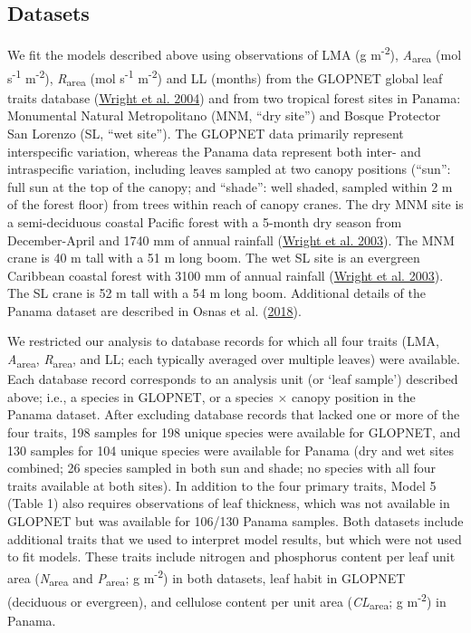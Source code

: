 \documentclass[
  12pt,
  a4paper,
,tablecaptionabove
]{scrartcl}
\providecommand{\DIFaddend}{} %
\DeclareRobustCommand{\DIFaddend}{\DIFOaddend \let\includegraphics\DIFOincludegraphics} %
\begin{document}
\DIFaddend \hypertarget{datasets}{%
\subsection{Datasets}\label{datasets}}

We fit the models described above using observations of LMA (g m\textsuperscript{-2}), \emph{A}\textsubscript{area} (mol s\textsuperscript{-1} m\textsuperscript{-2}), \emph{R}\textsubscript{area} (mol s\textsuperscript{-1} m\textsuperscript{-2}) and LL (months) from the GLOPNET global leaf traits database (\protect\hyperlink{ref-Wright2004a}{Wright et al. 2004}) and from two tropical forest sites in Panama: Monumental Natural Metropolitano (MNM, ``dry site'') and Bosque Protector San Lorenzo (SL, ``wet site'').
The GLOPNET data primarily represent interspecific variation, whereas the Panama data represent both inter- and intraspecific variation, including leaves sampled at two canopy positions (``sun'': full sun at the top of the canopy; and ``shade'': well shaded, sampled within 2 m of the forest floor) from trees within reach of canopy cranes.
The dry MNM site is a semi-deciduous coastal Pacific forest with a 5-month dry season from December-April and 1740 mm of annual rainfall (\protect\hyperlink{ref-Wright2003}{Wright et al. 2003}).
The MNM crane is 40 m tall with a 51 m long boom. The wet SL site is an evergreen Caribbean coastal forest with 3100 mm of annual rainfall (\protect\hyperlink{ref-Wright2003}{Wright et al. 2003}).
The SL crane is 52 m tall with a 54 m long boom.
Additional details of the Panama dataset are described in Osnas et al. (\protect\hyperlink{ref-Osnas2018}{2018}).

We restricted our analysis to database records for which all four traits (LMA, \emph{A}\textsubscript{area}, \emph{R}\textsubscript{area}, and LL; each typically averaged over multiple leaves) were available.
Each database record corresponds to an analysis unit (or `leaf sample') described above; i.e., a species in GLOPNET, or a species \(\times\) canopy position in the Panama dataset.
After excluding database records that lacked one or more of the four traits, 198 samples for 198 unique species were available for GLOPNET, and 130 samples for 104 unique species were available for Panama (dry and wet sites combined; 26 species sampled in both sun and shade; no species with all four traits available at both sites).
In addition to the four primary traits, Model 5 (Table 1) also requires observations of leaf thickness, which was not available in GLOPNET but was available for 106/130 Panama samples.
Both datasets include additional traits that we used to interpret model results, but which were not used to fit models. These traits include nitrogen and phosphorus content per leaf unit area (\emph{N}\textsubscript{area} and \emph{P}\textsubscript{area}; g m\textsuperscript{-2}) in both datasets, leaf habit in GLOPNET (deciduous or evergreen), and cellulose content per unit area (\emph{CL}\textsubscript{area}; g m\textsuperscript{-2}) in Panama.
\end{document}
